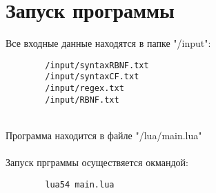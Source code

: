 \documentclass[12pt]{article}
\begin{document}
    \clearpage


    \section{Запуск программы}

    Все входные данные находятся в папке "/input":
    \begin{lstlisting}
        /input/syntaxRBNF.txt
        /input/syntaxCF.txt
        /input/regex.txt
        /input/RBNF.txt
    \end{lstlisting}

    \hfill \\
    Программа находится в файле "/lua/main.lua"\\
    \hfill \\
    Запуск прграммы осуществяется окмандой:
    \begin{lstlisting}
        lua54 main.lua
    \end{lstlisting}
\end{document}

